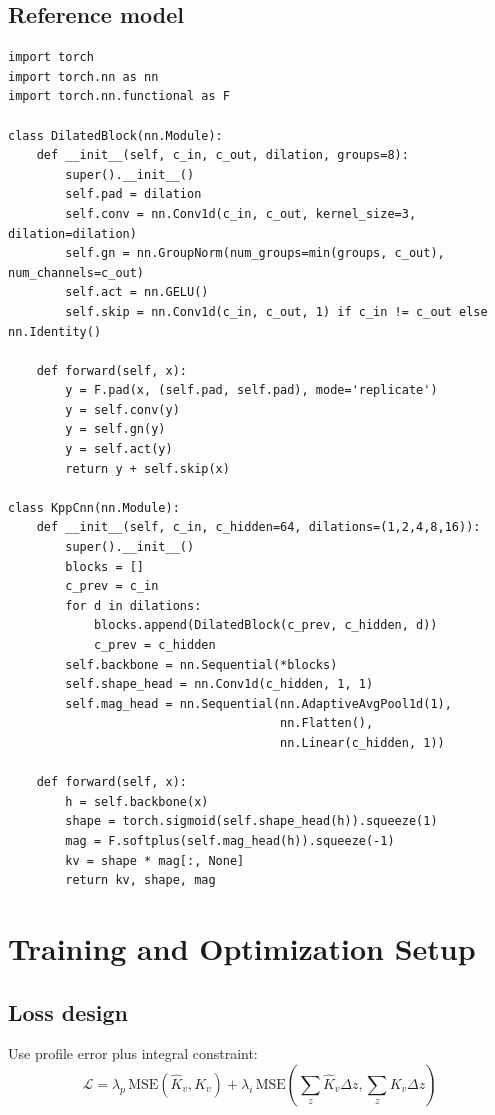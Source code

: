 \documentclass[11pt, a4paper]{article}
\begin{document}
\subsection{Reference model}

\begin{verbatim}
import torch
import torch.nn as nn
import torch.nn.functional as F

class DilatedBlock(nn.Module):
    def __init__(self, c_in, c_out, dilation, groups=8):
        super().__init__()
        self.pad = dilation
        self.conv = nn.Conv1d(c_in, c_out, kernel_size=3, dilation=dilation)
        self.gn = nn.GroupNorm(num_groups=min(groups, c_out), num_channels=c_out)
        self.act = nn.GELU()
        self.skip = nn.Conv1d(c_in, c_out, 1) if c_in != c_out else nn.Identity()

    def forward(self, x):
        y = F.pad(x, (self.pad, self.pad), mode='replicate')
        y = self.conv(y)
        y = self.gn(y)
        y = self.act(y)
        return y + self.skip(x)

class KppCnn(nn.Module):
    def __init__(self, c_in, c_hidden=64, dilations=(1,2,4,8,16)):
        super().__init__()
        blocks = []
        c_prev = c_in
        for d in dilations:
            blocks.append(DilatedBlock(c_prev, c_hidden, d))
            c_prev = c_hidden
        self.backbone = nn.Sequential(*blocks)
        self.shape_head = nn.Conv1d(c_hidden, 1, 1)
        self.mag_head = nn.Sequential(nn.AdaptiveAvgPool1d(1),
                                      nn.Flatten(),
                                      nn.Linear(c_hidden, 1))

    def forward(self, x):
        h = self.backbone(x)
        shape = torch.sigmoid(self.shape_head(h)).squeeze(1)
        mag = F.softplus(self.mag_head(h)).squeeze(-1)
        kv = shape * mag[:, None]
        return kv, shape, mag
\end{verbatim}

\section{Training and Optimization Setup}

\subsection{Loss design}
Use profile error plus integral constraint:
\begin{equation}
\mathcal{L} = \lambda_p\,\text{MSE}(\hat{K}_v, K_v) +
\lambda_i\,\text{MSE}\left(\sum_z \hat{K}_v\Delta z, \sum_z K_v\Delta z\right)
\end{equation}
\end{document}
